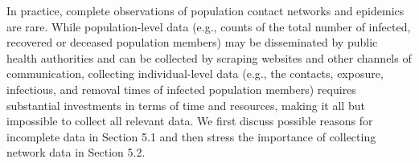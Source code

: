 In practice,
complete observations of population contact networks and epidemics are rare.
While population-level data (e.g., counts of the total number of infected, recovered or deceased population members) may be disseminated by public health authorities and can be collected by scraping websites and other channels of communication,
collecting individual-level data (e.g., the contacts, exposure, infectious, and removal times of infected population members) requires substantial investments in terms of time and resources,
making it all but impossible to collect all relevant data.
We first discuss possible reasons for incomplete data in Section 5.1
and then stress the importance of collecting network data in Section 5.2.

